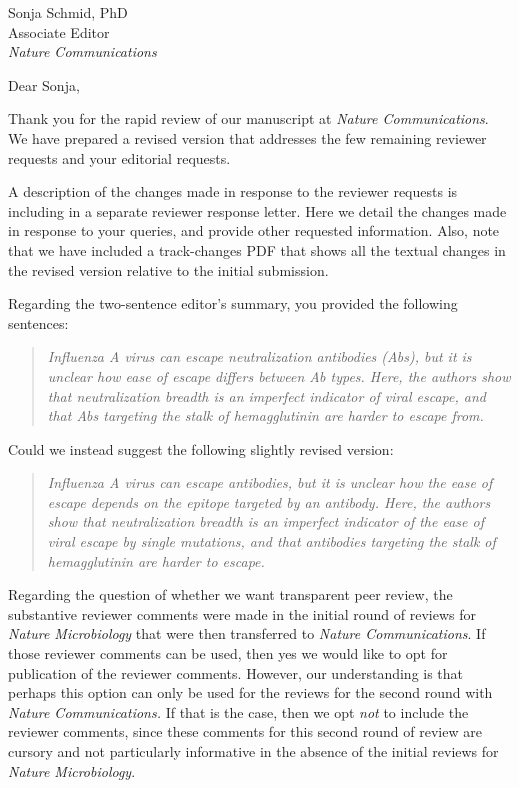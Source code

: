 \documentclass[a4paper,11pt]{letter}
\begin{document}
\begin{letter}{Sonja Schmid, PhD \\ Associate Editor \\ \textit{Nature Communications} }

\opening{Dear Sonja,} %

Thank you for the rapid review of our manuscript at \textit{Nature Communications}. 
We have prepared a revised version that addresses the few remaining reviewer requests and your editorial requests.

A description of the changes made in response to the reviewer requests is including in a separate reviewer response letter.
Here we detail the changes made in response to your queries, and provide other requested information.
Also, note that we have included a track-changes PDF that shows all the textual changes in the revised version relative to the initial submission.

Regarding the two-sentence editor's summary, you provided the following sentences:
\begin{quote}
\textsl{
Influenza A virus can escape neutralization antibodies (Abs), but it is unclear how ease of escape differs between Ab types. Here, the authors show that neutralization breadth is an imperfect indicator of viral escape, and that Abs targeting the stalk of hemagglutinin are harder to escape from.}
\end{quote}

Could we instead suggest the following slightly revised version:
\begin{quote}
\textsl{
Influenza A virus can escape antibodies, but it is unclear how the ease of escape depends on the epitope targeted by an antibody. Here, the authors show that neutralization breadth is an imperfect indicator of the ease of viral escape by single mutations, and that antibodies targeting the stalk of hemagglutinin are harder to escape.
}
\end{quote}

Regarding the question of whether we want transparent peer review, the substantive reviewer comments were made in the initial round of reviews for \textit{Nature Microbiology} that were then transferred to \textit{Nature Communications}.
If those reviewer comments can be used, then yes we would like to opt for publication of the reviewer comments.
However, our understanding is that perhaps this option can only be used for the reviews for the second round with \textit{Nature Communications.}
If that is the case, then we opt \emph{not} to include the reviewer comments, since these comments for this second round of review are cursory and not particularly informative in the absence of the initial reviews for \textit{Nature Microbiology}.


\end{letter}
\end{document}
